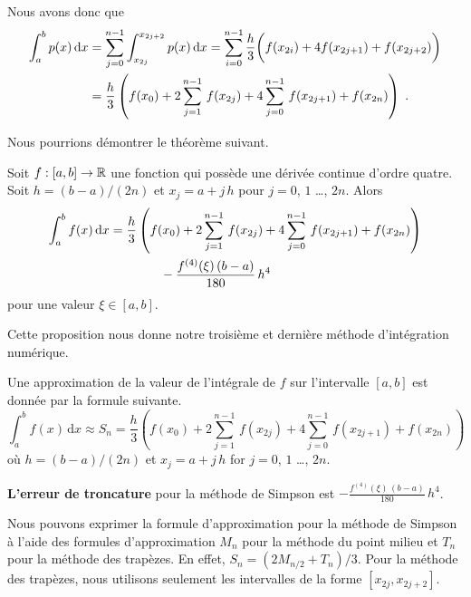 {Nous avons donc que
\begin{align*}
\int_a^b p(x) \,\mathrm{d}x &= \sum_{j=0}^{n-1} \int_{x_{2j}}^{x_{2j+2}}p(x)  \,\mathrm{d}x
= \sum_{i=0}^{n-1} \frac{h}{3}
\bigg(f(x_{2i}) + 4 f(x_{2j+1}) + f(x_{2j+2}) \bigg) \\
&= \frac{h}{3} \left(f(x_0) + 2\sum_{j=1}^{n-1}\,f(x_{2j}) + 4
\sum_{j=0}^{n-1}\,f(x_{2j+1}) + f(x_{2n}) \right) \; .
\end{align*}

Nous pourrions démontrer le théorème suivant.

\begin{focus}{\prp}
Soit $f:[a,b]\rightarrow \mathbb{R}$ une fonction qui possède une dérivée
continue d'ordre quatre.  Soit $h=(b-a)/(2n)$ et $x_j = a+j\,h$ pour
$j=0$, $1$ \ldots, $2n$.  Alors
\begin{align*}
\int_{a}^{b} f(x)\,\mathrm{d}x &= \frac{h}{3} \left(f(x_0)
+ 2\sum_{j=1}^{n-1}\,f(x_{2j}) + 4 \sum_{j=0}^{n-1}\,f(x_{2j+1})
+ f(x_{2n}) \right) \\
& \qquad \qquad - \frac{f^{(4)}(\xi)\,(b-a)}{180}\, h^4
\end{align*}
pour une valeur $\xi \in [a,b]$.
\end{focus}

Cette proposition nous donne notre troisième et dernière méthode
d'intégration numérique.

\begin{focus}{\mth} 
Une approximation de la valeur de l'intégrale de $f$ sur l'intervalle
$[a,b]$ est donnée par la formule suivante.
\[
\int_{a}^{b} f(x)\,\text{d}x \approx  S_n =
\frac{h}{3} \left(f(x_0) + 2\sum_{j=1}^{n-1}\,f(x_{2j}) + 4
\sum_{j=0}^{n-1}\,f(x_{2j+1}) + f(x_{2n}) \right)
\]
où $h=(b-a)/(2n)$ et $x_j = a+j\,h$ for $j=0$, $1$ \ldots, $2n$.

{\bfseries L'erreur de troncature}
pour la méthode de Simpson est
$\displaystyle  - \frac{f^{(4)}(\xi)\,(b-a)}{180}\, h^4 $.
\label{CSR}
\end{focus}

\begin{rmk}
Nous pouvons exprimer la formule d'approximation pour la méthode de Simpson
à l'aide des formules d'approximation $M_n$ pour la méthode du point
milieu et $T_n$ pour la méthode des trapèzes.  En effet,
$S_n = (2 M_{n/2} + T_n)/3$.  Pour la méthode des trapèzes, nous utilisons
seulement les intervalles de la forme $[x_{2j},x_{2j+2}]$.
\end{rmk}

}
